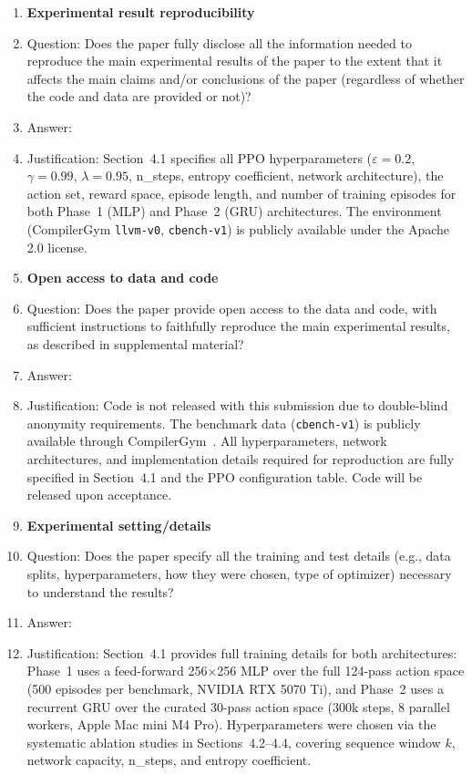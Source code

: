 \begin{enumerate}
\item {\bf Experimental result reproducibility}
    \item[] Question: Does the paper fully disclose all the information needed to reproduce the main experimental results of the paper to the extent that it affects the main claims and/or conclusions of the paper (regardless of whether the code and data are provided or not)?
    \item[] Answer: \answerYes{}
    \item[] Justification: Section~4.1 specifies all PPO hyperparameters ($\varepsilon{=}0.2$, $\gamma{=}0.99$, $\lambda{=}0.95$, n\_steps, entropy coefficient, network architecture), the action set, reward space, episode length, and number of training episodes for both Phase~1 (MLP) and Phase~2 (GRU) architectures. The environment (CompilerGym \texttt{llvm-v0}, \texttt{cbench-v1}) is publicly available under the Apache 2.0 license.

\item {\bf Open access to data and code}
    \item[] Question: Does the paper provide open access to the data and code, with sufficient instructions to faithfully reproduce the main experimental results, as described in supplemental material?
    \item[] Answer: \answerNo{}
    \item[] Justification: Code is not released with this submission due to double-blind anonymity requirements. The benchmark data (\texttt{cbench-v1}) is publicly available through CompilerGym~\cite{CompilerGym}. All hyperparameters, network architectures, and implementation details required for reproduction are fully specified in Section~4.1 and the PPO configuration table. Code will be released upon acceptance.

\item {\bf Experimental setting/details}
    \item[] Question: Does the paper specify all the training and test details (e.g., data splits, hyperparameters, how they were chosen, type of optimizer) necessary to understand the results?
    \item[] Answer: \answerYes{}
    \item[] Justification: Section~4.1 provides full training details for both architectures: Phase~1 uses a feed-forward 256$\times$256 MLP over the full 124-pass action space (500 episodes per benchmark, NVIDIA RTX 5070 Ti), and Phase~2 uses a recurrent GRU over the curated 30-pass action space (300k steps, 8 parallel workers, Apple Mac mini M4 Pro). Hyperparameters were chosen via the systematic ablation studies in Sections~4.2--4.4, covering sequence window $k$, network capacity, n\_steps, and entropy coefficient.


\end{enumerate}
